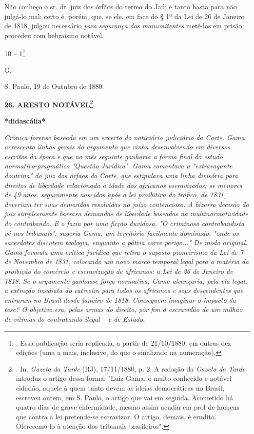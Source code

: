 Não conheço o sr. dr. juiz dos órfãos do termo do Jaú; e tanto basta
para não julgá-lo mal; certo é, porém, que, se ele, em face do § 1º da
Lei de 26 de Janeiro de 1818, julgou necessário \emph{para segurança dos
manumitentes} metê-los em prisão, procedeu com hebraísmo notável.

10 -- 1\footnote{. Essa publicação seria replicada, a partir de
  21/10/1880, em outras dez edições (uma a mais, inclusive, do que o
  sinalizado na numeração).}

G.

S. Paulo, 19 de Outubro de 1880.

\textbf{26. ARESTO NOTÁVEL}\footnote{. In. \emph{Gazeta da Tarde} (RJ),
  17/11/1880, p. 2. A redação da \emph{Gazeta da Tarde} introduz o
  artigo dessa forma: "Luiz Gama, o muito conhecido e notável cidadão,
  aquele à quem tanto devem as ideias democráticas no Brasil, escreveu
  ontem, em S. Paulo, o artigo que vai em seguida. Acometido há quatro
  dias de grave enfermidade, mesmo assim acudiu em prol de homens que
  contra a lei pretende-se escravizar. O artigo, demais, é erudito.
  Oferecemo-lo à atenção dos tribunais brasileiros".}

\textbf{*didascália*}

\emph{Crônica forense baseada em um excerto do noticiário judiciário da
Corte. Gama acrescenta linhas gerais do argumento que vinha
desenvolvendo em diversos escritos da época e que no mês seguinte
ganharia a forma final do estudo normativo-pragmático "Questão
Jurídica". Gama comentava a "extravagante doutrina" do juiz dos órfãos
da Corte, que estipulava uma linha divisória para direitos de liberdade
relacionada à idade dos africanos escravizados; se menores de 49 anos,
seguramente nascidos após a lei proibitiva do tráfico, de 1831, deveriam
ter suas demandas resolvidas no juízo contencioso. A bizarra decisão do
juiz simplesmente barrava demandas de liberdade baseadas na
multinormatividade do contrabando. E o fazia por uma ficção duvidosa. "O
criminoso contrabandista vê nos tribunais", sugeria Gama, um território
facilmente dominado, "onde os sacerdotes discutem teologia, enquanto a
pátria corre perigo..." De modo original, Gama formula uma crítica
jurídica que retira o suposto pioneirismo da Lei de 7 de Novembro de
1831, colocando um novo marco temporal legal para a matéria da proibição
do comércio e escravização de africanos: a Lei de 26 de Janeiro de 1818.
Se o argumento ganhasse força normativa, Gama alcançaria, pela via
legal, a extinção imediata do cativeiro para todos os africanos e seus
descendentes que entraram no Brasil desde janeiro de 1818. Conseguem
imaginar o impacto da tese? O objetivo era, pelas armas do direito, pôr
fim à escravidão de um milhão de vítimas do contrabando ilegal -- e de
Estado. }

